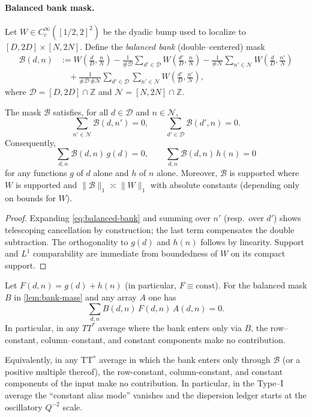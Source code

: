 \paragraph{Balanced bank mask.}
Let $W\in C_c^\infty([1/2,2]^2)$ be the dyadic bump used to localize to $[D,2D]\times[N,2N]$. Define the \emph{balanced bank} (double–centered) mask
\begin{align}
\mathcal{B}(d,n)
&:= W\!\left(\frac dD,\frac nN\right)
 - \frac{1}{\#\mathcal{D}}\sum_{d'\in\mathcal{D}} W\!\left(\frac {d'}D,\frac nN\right)
 - \frac{1}{\#\mathcal{N}}\sum_{n'\in\mathcal{N}} W\!\left(\frac dD,\frac {n'}N\right) \nonumber\\
&\quad + \frac{1}{\#\mathcal{D}\,\#\mathcal{N}}\sum_{d'\in\mathcal{D}}\sum_{n'\in\mathcal{N}} W\!\left(\frac {d'}D,\frac {n'}N\right),
\label{eq:balanced-bank}
\end{align}
where $\mathcal{D}=[D,2D]\cap\mathbb{Z}$ and $\mathcal{N}=[N,2N]\cap\mathbb{Z}$.

\begin{lemma}[Alias suppression, $\delta=2$]\label{lem:alias-delta2}
The mask $\mathcal{B}$ satisfies, for all $d\in\mathcal{D}$ and $n\in\mathcal{N}$,
\[
\sum_{n'\in\mathcal{N}} \mathcal{B}(d,n')=0,\qquad
\sum_{d'\in\mathcal{D}} \mathcal{B}(d',n)=0.
\]
Consequently,
\[
\sum_{d,n}\mathcal{B}(d,n)\,g(d)=0,\qquad
\sum_{d,n}\mathcal{B}(d,n)\,h(n)=0
\]
for any functions $g$ of $d$ alone and $h$ of $n$ alone. Moreover, $\mathcal{B}$ is supported where $W$ is supported and $\|\mathcal{B}\|_1\asymp \|W\|_1$ with absolute constants (depending only on bounds for $W$).
\end{lemma}

\begin{proof}
Expanding \eqref{eq:balanced-bank} and summing over $n'$ (resp.\ over $d'$) shows telescoping cancellation by construction; the last term compensates the double subtraction. The orthogonality to $g(d)$ and $h(n)$ follows by linearity. Support and $L^1$ comparability are immediate from boundedness of $W$ on its compact support.
\end{proof}

\begin{corollary}\label{cor:alias-kills-const}
Let $F(d,n)=g(d)+h(n)$ (in particular, $F\equiv \mathrm{const}$). For the balanced mask $B$ in \ref{lem:bank-mass} and any array $A$ one has
\[
\sum_{d,n} B(d,n)\,F(d,n)\,A(d,n)=0.
\]
In particular, in any $TT^\ast$ average where the bank enters only via $B$, the row–constant, column–constant, and constant components make no contribution. 

Equivalently, in any TT$^\ast$ average in which the bank enters only through $\mathcal{B}$ (or a positive multiple thereof), the row-constant, column-constant, and constant components of the input make no contribution. In particular, in the Type–I average the “constant alias mode” vanishes and the dispersion ledger starts at the oscillatory $Q^{-2}$ scale.
\end{corollary}

